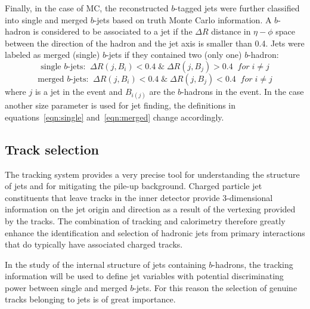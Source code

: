 Finally, in the case of MC, the reconstructed $b$-tagged jets were further classified into single and merged $b$-jets based on truth Monte Carlo information. A $b$-hadron is considered to be associated to a jet if the $\Delta R$ distance in $\eta-\phi$ space between the direction of the hadron and the jet axis is smaller than 0.4. Jets were labeled as merged (single) $b$-jets if they contained two (only one) $b$-hadron:%
\begin{equation}
\mbox{single $b$-jets:} \; \; \Delta R(j,B_i) < 0.4 \; \& \;  \Delta R(j,B_j) > 0.4 \; \; for \; i \neq j
\label{eqn:single}
\end{equation}
\begin{equation}
\mbox{merged $b$-jets:}  \; \; \Delta R(j,B_i) < 0.4 \; \& \;  \Delta R(j,B_j) < 0.4 \; \; for \; i \neq j
\label{eqn:merged}
\end{equation}
%
where $j$ is a jet in the event and $B_{i(j)}$ are the $b$-hadrons in the event. In the case another size parameter is used for jet finding, the definitions in equations~\ref{eqn:single} and~\ref{eqn:merged} change accordingly.


\subsection{Track selection}\label{sec:trackselection}
The tracking system provides a very precise tool for understanding the structure of jets and for mitigating the pile-up background.  Charged particle jet constituents that leave tracks in the inner detector provide 3-dimensional information on the jet origin and direction as a result of the vertexing provided by the tracks. The combination of tracking and calorimetry therefore greatly enhance the identification and selection of hadronic jets from primary interactions that do typically have associated charged tracks. 

In the study of the internal structure of jets containing $b$-hadrons, the tracking information will be used to define jet variables with potential discriminating power between single and merged $b$-jets.  For this reason the selection of genuine tracks belonging to jets is of great importance. %

